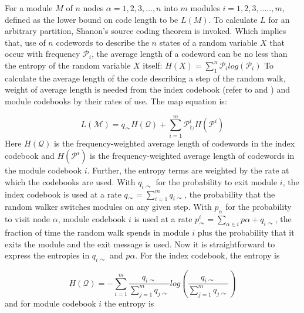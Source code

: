 {For a module $M$ of $n$ nodes $\alpha = 1,2,3,...,n$ into $m$
modules $i = 1,2,3,.....,m$, defined as the lower bound on code length to be $L(M)$. To calculate $L$ for an arbitrary partition, Shanon's source coding theorem \cite{ref-45} is invoked. Which implies that, use of $n$ codewords to describe the $n$ states of a random variable $X$ that occur with frequency $\mathcal{P}_i$, the average length of a codeword can be no less than the entropy of the random variable $X$ itself:
$H(X) = \sum_{1}^{n}\mathcal{P}_i log(\mathcal{P}_i)$
To calculate the average length of the code describing a step of the random walk, weight of average length is needed from the index codebook ({refer to \cite{ref-44} and \cite{ref-43}}) and module codebooks by their rates of use. The map equation is:

\begin{equation}\label{eq:infomap_map_equation}
L(\mathcal{M}) = q_\curvearrowright H(\mathcal{Q}) + \sum_{i=1}^m \mathcal{P}_\circlearrowright^i H(\mathcal{P}^i)
\end{equation}
Here $H(\mathcal{Q})$ is the frequency-weighted average length of codewords in the index codebook and $H(\mathcal{P}^i)$ is the frequency-weighted average length of codewords in the module codebook $i$. Further, the entropy terms are weighted by the rate at which the codebooks are used. With $q_{i\curvearrowright}$ for the probability to exit module $i$, the index codebook is used at a rate $q_{\curvearrowright} = \sum_{i=1}^{m} q_{i\curvearrowright}$, the probability that the random walker switches modules on any given step. With $p_\alpha$ for the probability to visit node $\alpha$, module codebook $i$ is used at a rate $p_{\curvearrowright}^i = \sum_{\alpha \in i} p\alpha + q_{i\curvearrowright}$, the fraction of time the random walk spends in module $i$ plus the probability that it exits the module and the exit message is used. Now it is straightforward to express the entropies in $q_{i\curvearrowright}$ and $p\alpha$. For the index codebook, the entropy is

\begin{equation}\label{eq:infomap_index_entropy}
H(\mathcal{Q}) = - \sum_{i=1}^{m} \dfrac{q_{i\curvearrowright}}{\sum_{j=1}^{m}q_{j\curvearrowright}} log \left(\dfrac{q_{i\curvearrowright}}{\sum_{j=1}^{m} q_{j\curvearrowright}}\right)
\end{equation}
and for module codebook $i$ the entropy is

}
